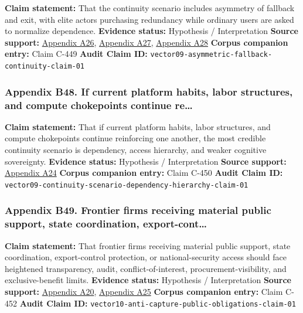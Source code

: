 \documentclass[
  american,
  11pt,
  letterpaper,
]{article}
\begin{document}
\textbf{Claim statement:} That the continuity scenario includes
asymmetry of fallback and exit, with elite actors purchasing redundancy
while ordinary users are asked to normalize dependence. \textbf{Evidence
status:} Hypothesis / Interpretation \textbf{Source support:}
\hyperref[appendix-a26-sam-altman-s-manifest-destiny]{Appendix A26},
\hyperref[appendix-a27-inside-mark-zuckerbergs-top-secret-hawaii-compound]{Appendix
A27},
\hyperref[appendix-a28-new-zealand-woos-the-wealthy-with-golden-visa-changes]{Appendix
A28} \textbf{Corpus companion entry:} Claim C-449 \textbf{Audit Claim
ID:} \texttt{vector09-asymmetric-fallback-continuity-claim-01}

\subsubsection{Appendix B48. If current platform habits, labor
structures, and compute chokepoints continue
re\ldots{}}\label{appendix-b48-if-current-platform-habits-labor-structures-and-compute-chokepoints-continue-re}

\textbf{Claim statement:} That if current platform habits, labor
structures, and compute chokepoints continue reinforcing one another,
the most credible continuity scenario is dependency, access hierarchy,
and weaker cognitive sovereignty. \textbf{Evidence status:} Hypothesis /
Interpretation \textbf{Source support:}
\hyperref[appendix-a24-the-adolescence-of-technology]{Appendix A24}
\textbf{Corpus companion entry:} Claim C-450 \textbf{Audit Claim ID:}
\texttt{vector09-continuity-scenario-dependency-hierarchy-claim-01}

\subsubsection{Appendix B49. Frontier firms receiving material public
support, state coordination,
export-cont\ldots{}}\label{appendix-b49-frontier-firms-receiving-material-public-support-state-coordination-export-cont}

\textbf{Claim statement:} That frontier firms receiving material public
support, state coordination, export-control protection, or
national-security access should face heightened transparency, audit,
conflict-of-interest, procurement-visibility, and exclusive-benefit
limits. \textbf{Evidence status:} Hypothesis / Interpretation
\textbf{Source support:}
\hyperref[appendix-a20-openais-proposals-for-the-us-ai-action-plan]{Appendix
A20},
\hyperref[appendix-a25-ftc-opens-inquiry-into-big-tech-s-partnerships-with-leading-ai-startups]{Appendix
A25} \textbf{Corpus companion entry:} Claim C-452 \textbf{Audit Claim
ID:} \texttt{vector10-anti-capture-public-obligations-claim-01}
\end{document}
